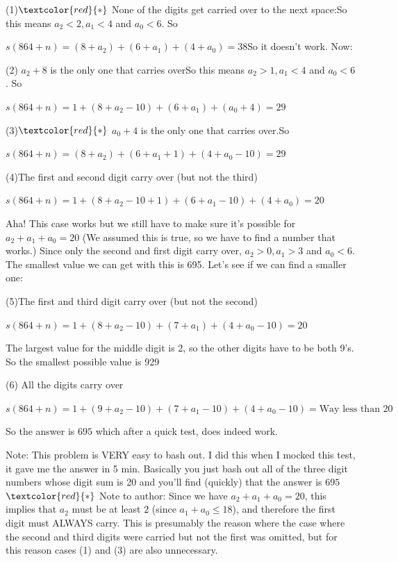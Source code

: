 \begin{enumerate}
 (1)$\textcolor{red}{*}$ None of the digits get carried over to the next space:So this means $a_2<2, a_1<4$ and $a_0<6$. So 

 $s(864+n)=(8+a_2)+(6+a_1)+(4+a_0)=38$So it doesn't work. Now:

 (2) $a_2+8$ is the only one that carries overSo this means $a_2>1, a_1<4$ and $a_0<6$. So

 $s(864+n)=1+(8+a_2-10)+(6+a_1)+(a_0+4)=29$ 

 (3)$\textcolor{red}{*}$ $a_0+4$ is the only one that carries over.So

 $s(864+n)=(8+a_2)+(6+a_1+1)+(4+a_0-10)=29$

 (4)The first and second digit carry over (but not the third)

 $s(864+n)=1+(8+a_2-10+1)+(6+a_1-10)+(4+a_0)=20$

 Aha! This case works but we still have to make sure it's possible for $a_2+a_1+a_0=20$ (We assumed this is true, so we have to find a number that works.) Since only the second and first digit carry over, $a_2>0, a_1>3$ and $a_0<6$. The smallest value we can get with this is 695. Let's see if we can find a smaller one:

 (5)The first and third digit carry over (but not the second)

 $s(864+n)=1+(8+a_2-10)+(7+a_1)+(4+a_0-10)=20$

 The largest value for the middle digit is 2, so the other digits have to be both 9's. So the smallest possible value is 929

 (6) All the digits carry over

 $s(864+n)=1+(9+a_2-10)+(7+a_1-10)+(4+a_0-10)=\text{Way less than 20}$

 
So the answer is $\boxed{695}$ which after a quick test, does indeed work.

 Note: This problem is VERY easy to bash out. I did this when I mocked this test, it gave me the answer in 5 min. Basically you just bash out all of the three digit numbers whose digit sum is 20 and you'll find (quickly) that the answer is $\boxed{695}$
$\textcolor{red}{*}$ Note to author: Since we have $a_2+a_1+a_0=20$, this implies that $a_2$ must be at least $2$ (since $a_1+a_0 \le 18$), and therefore the first digit must ALWAYS carry. This is presumably the reason where the case where the second and third digits were carried but not the first was omitted, but for this reason cases (1) and (3) are also unnecessary.

 




\end{enumerate}
